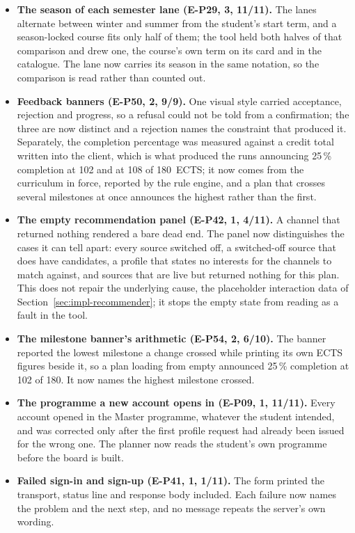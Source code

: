\begin{itemize}
    \item \textbf{The season of each semester lane (E-P29, 3, 11/11).} The lanes alternate between winter and summer from the student's start term, and a season-locked course fits only half of them; the tool held both halves of that comparison and drew one, the course's own term on its card and in the catalogue. The lane now carries its season in the same notation, so the comparison is read rather than counted out.
    \item \textbf{Feedback banners (E-P50, 2, 9/9).} One visual style carried acceptance, rejection and progress, so a refusal could not be told from a confirmation; the three are now distinct and a rejection names the constraint that produced it. Separately, the completion percentage was measured against a credit total written into the client, which is what produced the runs announcing 25\,\% completion at 102 and at 108 of 180~ECTS; it now comes from the curriculum in force, reported by the rule engine, and a plan that crosses several milestones at once announces the highest rather than the first.
    \item \textbf{The empty recommendation panel (E-P42, 1, 4/11).} A channel that returned nothing rendered a bare dead end. The panel now distinguishes the cases it can tell apart: every source switched off, a switched-off source that does have candidates, a profile that states no interests for the channels to match against, and sources that are live but returned nothing for this plan. This does not repair the underlying cause, the placeholder interaction data of Section~\ref{sec:impl-recommender}; it stops the empty state from reading as a fault in the tool.
    \item \textbf{The milestone banner's arithmetic (E-P54, 2, 6/10).} The banner reported the lowest milestone a change crossed while printing its own ECTS figures beside it, so a plan loading from empty announced 25\,\% completion at 102 of 180. It now names the highest milestone crossed.
    \item \textbf{The programme a new account opens in (E-P09, 1, 11/11).} Every account opened in the Master programme, whatever the student intended, and was corrected only after the first profile request had already been issued for the wrong one. The planner now reads the student's own programme before the board is built.
    \item \textbf{Failed sign-in and sign-up (E-P41, 1, 1/11).} The form printed the transport, status line and response body included. Each failure now names the problem and the next step, and no message repeats the server's own wording.
\end{itemize}


